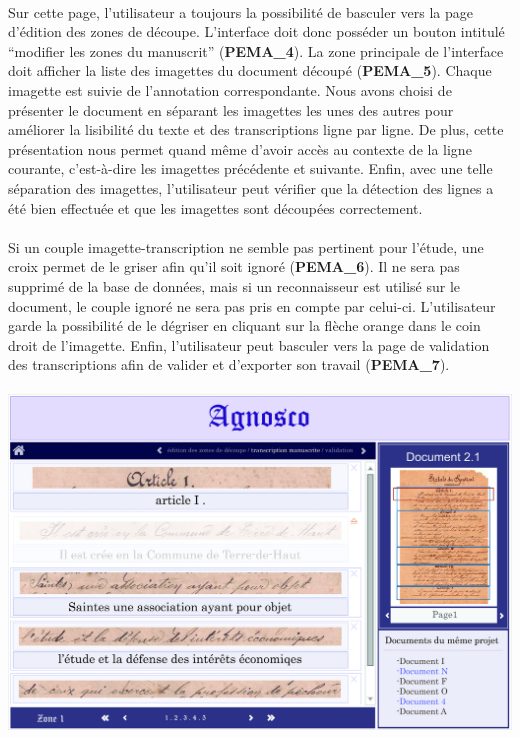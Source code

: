 \paragraph{}
Sur cette page, l’utilisateur a toujours la possibilité de basculer vers la
page d’édition des zones de découpe. L’interface doit donc posséder un bouton
intitulé “modifier les zones du manuscrit” (\textbf{PEMA\_4}). La zone
principale de l’interface doit afficher la liste des imagettes du document
découpé (\textbf{PEMA\_5}). Chaque imagette est suivie de l’annotation
correspondante. Nous avons choisi de présenter le document en séparant les
imagettes les unes des autres pour améliorer la lisibilité du texte et des
transcriptions ligne par ligne. De plus, cette présentation nous permet quand
même d’avoir accès au contexte de la ligne courante, c’est-à-dire les imagettes
précédente et suivante. Enfin, avec une telle séparation des imagettes,
l’utilisateur peut vérifier que la détection des lignes a été bien effectuée
et que les imagettes sont découpées correctement.

\paragraph{}
Si un couple imagette-transcription ne semble pas pertinent pour l’étude, une
croix permet de le griser afin qu’il soit ignoré (\textbf{PEMA\_6}). Il ne sera
pas supprimé de la base de données, mais si un reconnaisseur est utilisé sur
le document, le couple ignoré ne sera pas pris en compte par celui-ci.
L’utilisateur garde la possibilité de le dégriser en cliquant sur la flèche
orange dans le coin droit de l’imagette. Enfin, l’utilisateur peut basculer
vers la page de validation des transcriptions afin de valider et d’exporter son
travail (\textbf{PEMA\_7}).

\paragraph{}
\begin{mdframed}[frametitle={Figure 8 : Transcription manuscrite}, innerbottommargin=10]
\begin{center}
\includegraphics[scale=0.05]{ihm3.jpg}
\end{center}
\end{mdframed}

